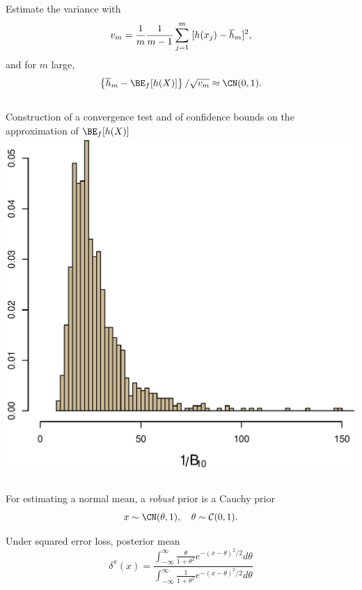 \begin{slide}
\end{slide}\begin{slide}
Estimate the variance with
$$
  v_m =  {1\over m} \frac{1}{m-1} \sum_{j=1}^{m} \; [h(x_{j})-{\overline{h}}_{m}]^2,
$$
and for $m$ large,
$$ 
  \left\{ \overline{h}_m - \BE_f[h(X)] \right\}   / \sqrt{v_m} \approx \CN(0,1).
$$

\medskip\pause
\begin{block}{} 
\begin{columns}
Construction of a convergence test
and of confidence bounds on the approximation of $\BE_f[h(X)]$
\includegraphics[height=3truecm]{figures/compbf}
\end{columns}
\end{block}

\end{slide}\begin{slide}
For estimating a normal mean, a 
{\it robust} prior is a Cauchy prior
$$
  x \sim \CN (\theta,1), \quad \theta \sim {\cal C}(0,1).
$$

Under squared error loss, posterior mean
$$
\delta^\pi(x)=\frac{\displaystyle{ \int_{-\infty}^{\infty} 
\frac{\theta}{1+\theta^2}} 
e^{-(x-\theta)^2/2} d\theta}{\displaystyle{\int_{-\infty}^{\infty} 
\frac{1}{1+\theta^2}} e^{-(x-\theta)^2/2} d\theta}
$$
\fin


\end{slide}
